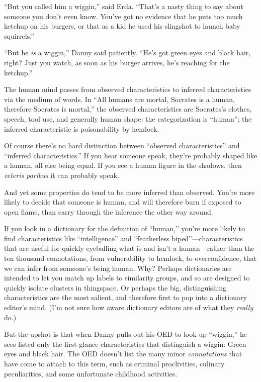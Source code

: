 {
 ``But you called him a
wiggin,'' said Erda.
``That's a nasty thing to say about
someone you don't even know. You've got
no evidence that he puts too much ketchup on his burgers, or that as a
kid he used his slingshot to launch baby
squirrels.''}

{
 ``But he \textit{is} a
wiggin,'' Danny said patiently.
``He's got green eyes and black hair,
right? Just you watch, as soon as his burger arrives,
he's reaching for the ketchup.''}

{
 The human mind passes from observed characteristics to inferred
characteristics via the medium of words. In ``All
humans are mortal, Socrates is a human, therefore Socrates is
mortal,'' the observed characteristics are
Socrates's clothes, speech, tool use, and generally
human shape; the categorization is
``human''; the inferred
characteristic is poisonability by hemlock.}

{
 Of course there's no hard distinction between
``observed characteristics'' and
``inferred characteristics.'' If you
hear someone speak, they're probably shaped like a
human, all else being equal. If you see a human figure in the shadows,
then \textit{ceteris paribus} it can probably speak.}

{
 And yet some properties do tend to be more inferred than observed.
You're more likely to decide that someone is human, and
will therefore burn if exposed to open flame, than carry through the
inference the other way around.}

{
 If you look in a dictionary for the definition of
``human,'' you're
more likely to find characteristics like
``intelligence'' and
``featherless
biped''---characteristics that are useful for quickly
eyeballing what is and isn't a human---rather than the
ten thousand connotations, from vulnerability to hemlock, to
overconfidence, that we can infer from someone's being
human. Why? Perhaps dictionaries are intended to let you match up
labels to similarity groups, and so are designed to quickly isolate
clusters in thingspace. Or perhaps the big, distinguishing
characteristics are the most salient, and therefore first to pop into a
dictionary editor's mind. (I'm not sure
how aware dictionary editors are of what they \textit{really} do.)}

{
 But the upshot is that when Danny pulls out his OED to look up
``wiggin,'' he sees listed only the
first-glance characteristics that distinguish a wiggin: Green eyes and
black hair. The OED doesn't list the many minor
\textit{connotations} that have come to attach to this term, such as
criminal proclivities, culinary peculiarities, and some unfortunate
childhood activities.}

